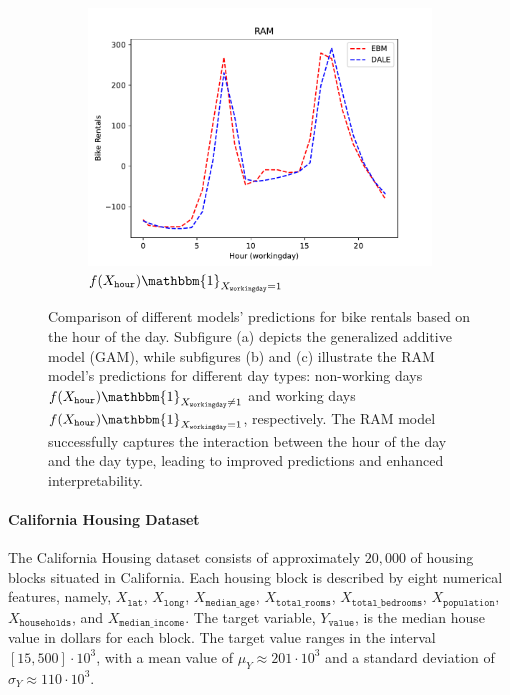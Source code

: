 \documentclass[runningheads]{llncs}
\newcommand{\when}[1]{\mathbbm{1}_{#1}}
\begin{document}
\begin{figure}[htbp]
    \begin{subfigure}{0.32\textwidth}
        \centering
        \includegraphics[width=\textwidth]{figures/bike_rentals_ram_2}
        \caption{\(f(X_{\mathtt{hour}}) \when{X_{\mathtt{workingday}} = 1}\)}
        \label{subfig:bike_rentals_regional_gam_2}
    \end{subfigure}
    \caption{Comparison of different models' predictions for bike rentals based on the hour of the day.
    Subfigure (a) depicts the generalized additive model (GAM),
        while subfigures (b) and (c) illustrate the RAM model's predictions for different day types: non-working days
        \(f(X_{\mathtt{hour}}) \when{X_{\mathtt{workingday}} \neq 1}\) and
        working days \(f(X_{\mathtt{hour}}) \when{X_{\mathtt{workingday}} = 1}\), respectively.
        The RAM model successfully captures the interaction between the hour of the day and the day type,
        leading to improved predictions and enhanced interpretability.}
    \label{fig:bike_sharing}
\end{figure}

\paragraph{California Housing Dataset}


The California Housing dataset consists of approximately $20,000$ of housing blocks situated in California.
Each housing block is described by eight numerical features, namely,
$X_{\mathtt{lat}}$, $X_{\mathtt{long}}$, $X_{\mathtt{median\_age}}$, $X_{\mathtt{total\_rooms}}$, $X_{\mathtt{total\_bedrooms}}$, $X_{\mathtt{population}}$, $X_{\mathtt{households}}$, and $X_{\mathtt{median\_income}}$.
The target variable, $Y_{\mathtt{value}}$, is the median house value in dollars for each block.
The target value ranges in the interval \([15, 500] \cdot 10^3\), with a mean value of
\(\mu_Y \approx 201 \cdot 10^3 \) and a standard deviation of \(\sigma_Y \approx 110 \cdot 10^3\).
\end{document}
